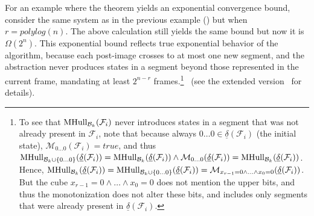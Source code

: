 \documentclass[acmsmall,screen]{acmart}
\newcommand{\true}{{\textit{true}}}
\newcommand{\tr}{\delta}
\newcommand{\Frame}{\mathcal{F}}
\newcommand{\set}[1]{\{{#1}\}}
\newcommand{\reflextr}[1]{\underline{#1}}
\newcommand{\postimage}[2]{{\reflextr{#1}}({#2})}
\newcommand{\bkwrch}[1]{\mathcal{B}_{#1}}
\newcommand{\monox}[2]{\mathcal{M}_{#2}({#1})}
\newcommand{\mhull}[2]{{\rm MHull}_{#2}({#1})}
\begin{document}
\begin{example}
For an example where the theorem yields an exponential convergence bound, consider the same system as in the previous example () but when $r=\textit{polylog}(n)$. The above calculation still yields the same bound but now it is $\Omega(2^n)$.
%
This exponential bound reflects true exponential behavior of the algorithm, because each post-image crosses to at most one new segment, and the abstraction never produces states in a segment beyond those represented in the current frame, mandating at least $2^{n-r}$ frames\iflong.\footnote{
	To see that $\mhull{\Frame_i}{\bkwrch{k}}$ never introduces states in a segment that was not already present in $\Frame_i$, note that because always $0\ldots0 \in \postimage{\tr}{\Frame_i}$ (the initial state), $\monox{\Frame_i}{0\ldots0}=\true$, and thus
	$\mhull{\postimage{\tr}{\Frame_i}}{\bkwrch{k} \cup \set{0\ldots0}}=\mhull{\postimage{\tr}{\Frame_i}}{\bkwrch{k}} \land \monox{\postimage{\tr}{\Frame_i}}{0\ldots0} = \mhull{\postimage{\tr}{\Frame_i}}{\bkwrch{k}}$. Hence, $\mhull{\postimage{\tr}{\Frame_i}}{\bkwrch{k}} = \mhull{\postimage{\tr}{\Frame_i}}{\bkwrch{k} \cup \set{0\ldots0}} = \monox{\postimage{\tr}{\Frame_i}}{x_{r-1}=0 \land \ldots \land x_0=0}$. But the cube $x_{r-1}=0 \land \ldots \land x_0=0$ does not mention the upper bits, and thus the monotonization does not alter these bits, and includes only segments that were already present in $\postimage{\tr}{\Frame_i}$.
}
\else
~(see the extended version~\cite{extendedVersion} for details).
\fi
%
%
\end{example}

%
%
%
%
%
%
\end{document}
